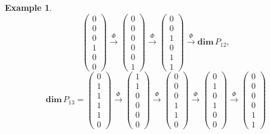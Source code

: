 \documentclass[11pt,a4paper]{amsart}
\theoremstyle{definition}
\newtheorem{example}[theorem]{Example}
\numberwithin{equation}{section}
\newcommand{\0}{\mathbf{0}}
\newcommand{\dimv}{\mathbf{dim}\,}
\begin{document}
\begin{example}
\[\begin{pmatrix}
			0\\0\\0\\1\\0\\0
		\end{pmatrix}
		\xrightarrow{\Phi}
		\begin{pmatrix}
			0\\0\\0\\0\\0\\1
		\end{pmatrix}
		\xrightarrow{\Phi}
		\begin{pmatrix}
			0\\0\\1\\0\\1\\1
		\end{pmatrix}
		\xrightarrow{\Phi}
		\dimv P_{12},
		\] 
		\[
		\dimv P_{13}=
		\begin{pmatrix}
			0\\1\\1\\1\\1\\0
		\end{pmatrix}
		\xrightarrow{\Phi}
		\begin{pmatrix}
			1\\1\\0\\0\\0\\0
		\end{pmatrix}
		\xrightarrow{\Phi}
		\begin{pmatrix}
			0\\0\\0\\1\\1\\0
		\end{pmatrix}
		\xrightarrow{\Phi}
		\begin{pmatrix}
			0\\1\\0\\1\\0\\0
		\end{pmatrix}
		\xrightarrow{\Phi}
		\begin{pmatrix}
			0\\0\\0\\0\\1\\1

\end{pmatrix}\]
\end{example}
\end{document}
